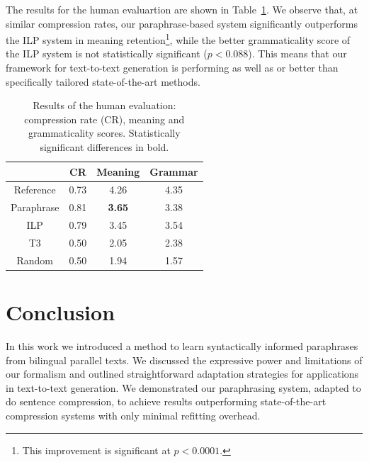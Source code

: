 \documentclass[11pt]{article}
\begin{document}
The results for the human evaluartion are shown in
Table~\ref{human_judgments}. We observe that, at similar compression
rates, our paraphrase-based system significantly outperforms the ILP
system in meaning retention\footnote{This improvement is significant
  at $p < 0.0001$.}, while the better grammaticality score of the ILP
system is not statistically significant ($p < 0.088$). This means that
our framework for text-to-text generation is performing as well as or
better than specifically tailored state-of-the-art methods.

\begin{table}
\begin{center}
\begin{tabular}{|c|c|c|c|}
  \hline
  & CR & Meaning & Grammar \\
  \hline
  Reference & 0.73 &  4.26 & 4.35 \\
  Paraphrase & 0.81 & {\bf 3.65} & 3.38 \\
  ILP & 0.79 & 3.45 & 3.54 \\
  T3 & 0.50 & 2.05 & 2.38 \\
  Random & 0.50 & 1.94 & 1.57 \\
  \hline
\end{tabular}
\end{center}
\caption{Results of the human evaluation: compression rate (CR),
  meaning and grammaticality scores. Statistically significant
  differences in bold.}
\label{human_judgments}
\end{table}



\section{Conclusion} \label{conclusion}

In this work we introduced a method to learn syntactically informed
paraphrases from bilingual parallel texts. We discussed the expressive
power and limitations of our formalism and outlined straightforward
adaptation strategies for applications in text-to-text generation. We
demonstrated our paraphrasing system, adapted to do sentence
compression, to achieve results outperforming state-of-the-art
compression systems with only minimal refitting overhead.




\end{document}
